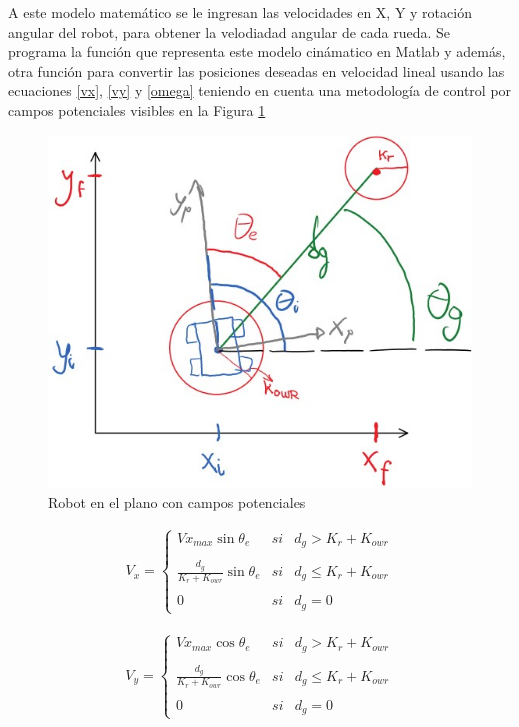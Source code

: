 \documentclass[conference]{IEEEtran}
\begin{document}
A este modelo matemático se le ingresan las velocidades en X, Y y rotación angular
del robot, para obtener la velodiadad angular de cada rueda. Se programa la función 
que representa este modelo cinámatico en Matlab y además, otra función para convertir 
las posiciones deseadas en velocidad lineal usando las ecuaciones
\ref{vx}, \ref{vy} y \ref{omega} teniendo en cuenta una metodología de control por 
campos potenciales \cite{gonzalez-villela_cinematica_2015} 
visibles en la Figura \ref{fig:campospotenciales}

\begin{figure}
  \includegraphics[width=\linewidth]{figures/campos_potenciales.jpg}
  \caption{Robot en el plano con campos potenciales}
  \label{fig:campospotenciales}
\end{figure}

\begin{gather}\label{vy}
  V_{x}= \left\{ \begin{array}{lcc}
    Vx_{max} \sin \theta_{e} & si & d_{g} > K_{r}+K_{owr} \\
    \\ \frac{d_{g}}{K_{r}+K_{owr}} \sin \theta_{e} &  si & d_{g} \leq  K_{r}+K_{owr} \\
    \\ 0 &  si  & d_{g} = 0
  \end{array}
  \right.
\end{gather}

\begin{gather}\label{vx}
  V_{y}= \left\{ \begin{array}{lcc}
    Vx_{max} \cos \theta_{e} & si & d_{g} > K_{r}+K_{owr} \\
    \\ \frac{d_{g}}{K_{r}+K_{owr}} \cos \theta_{e} &  si & d_{g} \leq  K_{r}+K_{owr} \\
    \\ 0 &  si  & d_{g} = 0
  \end{array}
  \right.
\end{gather}
\end{document}
